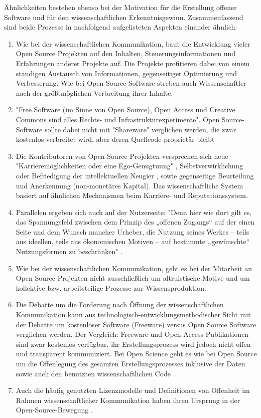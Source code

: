 Ähnlichkeiten bestehen ebenso bei der Motivation für die Erstellung offener Software und für den wissenschaftlichen Erkenntnisgewinn. Zusammenfassend sind beide Prozesse in nachfolgend aufgelisteten Aspekten einander ähnlich:
\begin{enumerate}
\item Wie bei der wissenschaftlichen Kommunikation, baut die Entwicklung vieler Open Source Projekten auf den Inhalten, Steuerungsinformationen und Erfahrungen anderer Projekte auf. Die Projekte profitieren dabei von einem ständigen Austausch von Informationen, gegenseitiger Optimierung und Verbesserung. Wie bei Open Source Software streben auch Wissenschaftler nach der größtmöglichen Verbreitung ihrer Inhalte.
\item "Free Software (im Sinne von Open Source), Open Access und Creative Commons sind alles Rechts- und Infrastrukturexperimente"\cite{kelty_2004}. Open Source-Software sollte dabei nicht mit "Shareware" verglichen werden, die zwar kostenlos verbreitet wird, aber deren Quellcode proprietär bleibt \cite{Lerner_2001}
\item Die Kontributoren von Open Source Projekten versprechen sich neue "Karrieremöglichkeiten oder eine Ego-Genugtuung" \cite{Lerner_2001}, Selbstverwirklichung oder Befriedigung der intellektuellen Neugier \cite{Willinsky_2005}, sowie gegenseitige Beurteilung und Anerkennung (non-monetäres Kapital). Das wissenschaftliche System basiert auf ähnlichen Mechanismen beim Karriere- und Reputationssystem.
\item Parallelen ergeben sich auch auf der Nutzerseite: "Denn hier wie dort gilt es, das Spannungsfeld zwischen dem Prinzip des „offenen Zugangs“ auf der einen Seite und dem Wunsch mancher Urheber, die Nutzung seines Werkes – teils aus ideellen, teils aus ökonomischen Motiven – auf bestimmte „gewünschte“ Nutzungsformen zu beschränken" \cite{dorschel_2006_open}.
\item Wie bei der wissenschaftlichen Kommunikation, geht es bei der Mitarbeit an Open Source Projekten nicht ausschließlich um altruistische Motive \cite{Lerner_2001} und um kollektive bzw. arbeitsteilige Prozesse zur Wissensproduktion.
\item Die Debatte um die Forderung nach Öffnung der wissenschaftlichen Kommunikation kann aus technologisch-entwicklungsmethodischer Sicht mit der Debatte um kostenloser Software (Freeware) versus Open Source Software verglichen werden. Der Vergleich: Freeware und Open Access Publikationen sind zwar kostenlos verfügbar, ihr Erstellungsprozess wird jedoch nicht offen und transparent kommuniziert. Bei Open Science geht es wie bei Open Source um die Offenlegung des gesamten Erstellungsprozesses inklusive der Daten \cite{grand_2012_open} sowie auch den benutzten wissenschaftlichen Code \cite{hey_2015_open}.
\item Auch die häufig genutzten Lizenzmodelle und Definitionen von Offenheit im Rahmen wissenschaftlicher Kommunikation haben ihren Ursprung in der Open-Source-Bewegung \cite{suchen}.
\end{enumerate}

